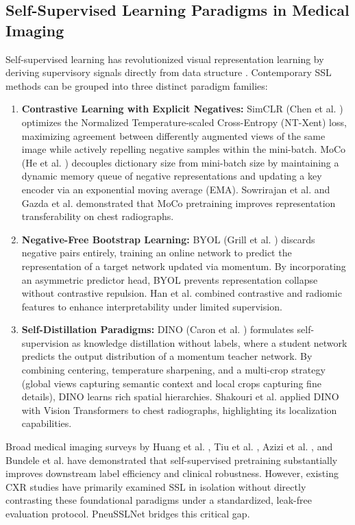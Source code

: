 \documentclass[journal,article,submit,moreauthors,pdftex]{Definitions/tsp}
\begin{document}
\subsection{Self-Supervised Learning Paradigms in Medical Imaging}
Self-supervised learning has revolutionized visual representation learning by deriving supervisory signals directly from data structure \cite{Huang23}. Contemporary SSL methods can be grouped into three distinct paradigm families:
\begin{enumerate}
    \item \textbf{Contrastive Learning with Explicit Negatives:} SimCLR (Chen et al. \cite{Chen20}) optimizes the Normalized Temperature-scaled Cross-Entropy (NT-Xent) loss, maximizing agreement between differently augmented views of the same image while actively repelling negative samples within the mini-batch. MoCo (He et al. \cite{He20}) decouples dictionary size from mini-batch size by maintaining a dynamic memory queue of negative representations and updating a key encoder via an exponential moving average (EMA). Sowrirajan et al. \cite{Sowrirajan21} and Gazda et al. \cite{Gazda21} demonstrated that MoCo pretraining improves representation transferability on chest radiographs.
    \item \textbf{Negative-Free Bootstrap Learning:} BYOL (Grill et al. \cite{Grill20}) discards negative pairs entirely, training an online network to predict the representation of a target network updated via momentum. By incorporating an asymmetric predictor head, BYOL prevents representation collapse without contrastive repulsion. Han et al. \cite{Han21} combined contrastive and radiomic features to enhance interpretability under limited supervision.
    \item \textbf{Self-Distillation Paradigms:} DINO (Caron et al. \cite{Caron21}) formulates self-supervision as knowledge distillation without labels, where a student network predicts the output distribution of a momentum teacher network. By combining centering, temperature sharpening, and a multi-crop strategy (global views capturing semantic context and local crops capturing fine details), DINO learns rich spatial hierarchies. Shakouri et al. \cite{Shakouri23} applied DINO with Vision Transformers to chest radiographs, highlighting its localization capabilities.
\end{enumerate}

Broad medical imaging surveys by Huang et al. \cite{Huang23}, Tiu et al. \cite{Tiu22}, Azizi et al. \cite{Azizi21}, and Bundele et al. \cite{Bundele24} have demonstrated that self-supervised pretraining substantially improves downstream label efficiency and clinical robustness. However, existing CXR studies have primarily examined SSL in isolation without directly contrasting these foundational paradigms under a standardized, leak-free evaluation protocol. PneuSSLNet bridges this critical gap.
\end{document}
